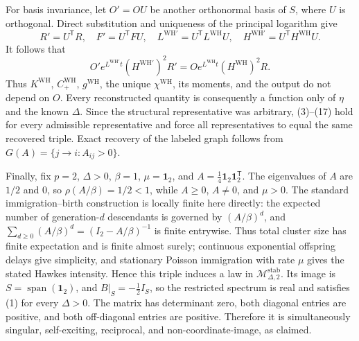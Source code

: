 For basis invariance, let \(O'=OU\) be another orthonormal basis of \(S\), where \(U\) is orthogonal.  Direct substitution and uniqueness of the principal logarithm give
\[
 R'=U^{\mathsf T}R,\quad F'=U^{\mathsf T}FU,\quad
 L^{\mathrm{WH}\prime}=U^{\mathsf T}L^{\mathrm{WH}}U,\quad
 H^{\mathrm{WH}\prime}=U^{\mathsf T}H^{\mathrm{WH}}U.
\tag{18}
\]
It follows that
\[
 O'e^{L^{\mathrm{WH}\prime}t}(H^{\mathrm{WH}\prime})^2R'
 =Oe^{L^{\mathrm{WH}}t}(H^{\mathrm{WH}})^2R.
\tag{19}
\]
Thus \(K^{\mathrm{WH}}\), \(C_{+}^{\mathrm{WH}}\), \(g^{\mathrm{WH}}\), the unique \(\chi^{\mathrm{WH}}\), its moments, and the output do not depend on \(O\).  Every reconstructed quantity is consequently a function only of \(\eta\) and the known \(\Delta\).  Since the structural representative was arbitrary, (3)--(17) hold for every admissible representative and force all representatives to equal the same recovered triple.  Exact recovery of the labeled graph follows from \(G(A)=\{j\to i:A_{ij}>0\}\).

Finally, fix \(p=2\), \(\Delta>0\), \(\beta=1\), \(\mu=\mathbf 1_2\), and \(A=\tfrac14\mathbf 1_2\mathbf 1_2^{\mathsf T}\).  The eigenvalues of \(A\) are \(1/2\) and \(0\), so \(\rho(A/\beta)=1/2<1\), while \(A\geq0\), \(A\neq0\), and \(\mu>0\).  The standard immigration--birth construction is locally finite here directly: the expected number of generation-\(d\) descendants is governed by \((A/\beta)^d\), and \(\sum_{d\geq0}(A/\beta)^d=(I_2-A/\beta)^{-1}\) is finite entrywise.  Thus total cluster size has finite expectation and is finite almost surely; continuous exponential offspring delays give simplicity, and stationary Poisson immigration with rate \(\mu\) gives the stated Hawkes intensity.  Hence this triple induces a law in \(\mathcal M_{\Delta,2}^{\mathrm{stab}}\).  Its image is \(S=\operatorname{span}(\mathbf 1_2)\), and \(B|_S=-\tfrac12 I_S\), so the restricted spectrum is real and satisfies (1) for every \(\Delta>0\).  The matrix has determinant zero, both diagonal entries are positive, and both off-diagonal entries are positive.  Therefore it is simultaneously singular, self-exciting, reciprocal, and non-coordinate-image, as claimed.